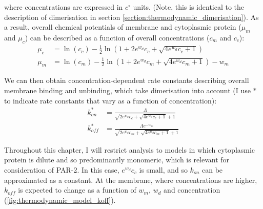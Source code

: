 \documentclass[12pt]{"report"}
\begin{document}
where concentrations are expressed in $c^{\circ}$ units. (Note, this is identical to the description of dimerisation in section \ref{section:thermodynamic_dimerisation}). As a result, overall chemical potentials of membrane and cytoplasmic protein ($\mu_m$ and $\mu_c$) can be described as a function of overall concentrations ($c_m$ and $c_c$):
\begin{align}
\mu_c &= \ln(c_c) - \frac{1}{2}\ln\left(1 + 2e^{w_d} c_c + \sqrt{4e^{w_d} c_c+ 1}\right)\\
\mu_m &= \ln(c_m) - \frac{1}{2}\ln\left(1 + 2e^{w_d} c_m + \sqrt{4e^{w_d} c_m + 1}\right) - w_m
\end{align}

We can then obtain concentration-dependent rate constants describing overall membrane binding and unbinding, which take dimerisation into account (I use $*$ to indicate rate constants that vary as a function of concentration):
\begin{align}
k_{on}^* &= \frac{\Lambda}{\sqrt{2 e^{w_d} c_c + \sqrt{4 e^{w_d} c_c + 1} + 1}}\\
k_{off}^* &= \frac{\Lambda e^{-w_m}}{\sqrt{2 e^{w_d} c_m + \sqrt{4 e^{w_d} c_m + 1} + 1}}
\end{align}


Throughout this chapter, I will restrict analysis to models in which cytoplasmic protein is dilute and so predominantly monomeric, which is relevant for consideration of PAR-2. In this case, $e^{w_d} c_c$ is small, and so $k_{on}$ can be approximated as a constant. At the membrane, where concentrations are higher, $k_{off}$ is expected to change as a function of $w_m$, $w_d$ and concentration (\cref{fig:thermodynamic_model_koff}).\\

\end{document}
